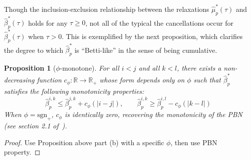 \documentclass[10pt]{article}
\numberwithin{equation}{section}
\newcommand{\+}{%
	\raisebox{0.18ex}{\scaleobj{0.55}{+}}
}
\newtheorem{proposition}{Proposition}
\theoremstyle{definition}
\theoremstyle{definition}
\begin{document}
\noindent Though the inclusion-exclusion relationship between the relaxations $\hat{\mu}_{p}^\ast(\tau)$ and $\hat{\beta}_{p}^{\ast}(\tau)$ holds for any $\tau \geq 0$, not all of the typical the cancellations occur for $\hat{\beta}_{p}^{\ast}(\tau)$ when $\tau > 0$.
This is exemplified by the next proposition, which clarifies the degree to which $\hat{\beta}_p^\ast$ is ``Betti-like'' in the sense of being cumulative. 
\begin{proposition}[$\phi$-monotone]
For all $i < j$ and all $k < l$, there exists a non-decreasing function $c_\phi : \mathbb{R} \to \mathbb{R}_+$ whose form depends only on $\phi$ such that $\hat{\beta}_p^\ast$ satisfies the following monotonicity properties:
\begin{equation}
	\hat{\beta}_p^{i,k} \leq \hat{\beta}_p^{j,k} + c_\phi(\lvert i - j \rvert), \quad \quad \hat{\beta}_p^{i,k} \geq \hat{\beta}_p^{i,l} - c_\phi(\lvert k - l \rvert)
\end{equation}
When $\phi = \mathrm{sgn}_+$, $c_\phi$ is identically zero, recovering the monotonicity of the PBN (see section 2.1 of~\cite{cerri2013betti}). 
\end{proposition}
\begin{proof}
	Use Proposition above part (b) with a specific $\phi$, then use PBN property.
\end{proof}

\end{document}
